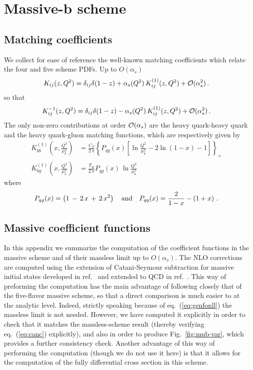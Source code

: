 \chapter{Massive-b scheme}

\section{Matching coefficients}
\label{sec:app-splitting}
We collect for ease of reference the well-known matching coefficients
which relate
the four and five scheme PDFs. Up to $O(\alpha_s)$
\begin{equation}
  K_{ij}(z,Q^2) = \delta_{ij}\delta(1-z) +
  \alpha_s(Q^2)\,K_{ij}^{(1)}(z,Q^2) +{\cal O}(\alpha_s^2)\,.
\end{equation}
so that
\begin{equation}
  K_{ij}^{-1}(z,Q^2) = \delta_{ij}\delta(1-z) -
  \alpha_s(Q^2)\,K_{ij}^{(1)}(z,Q^2) +{\cal O}(\alpha_s^2)\,.
\end{equation}
The only non-zero contributions at order ${\cal O}(\alpha_s)$
are the heavy quark-heavy quark and the heavy quark-gluon
matching functions, which are respectively given by
\begin{equation}
  \label{eq:ks}
  \begin{split}
    K_{bb}^{(1)}\left(x,\frac{Q^2}{\mu_b^2}\right) & = \frac{C_F}{2\,\pi}{\left\{P_{qq}(x)\left[
          \ln{\frac{Q^2}{\mu_b^2}} -2\ln(1-x)-1 \right] \right\}}_{+} \\
    K_{bg}^{(1)}\left(x,\frac{Q^2}{\mu_b^2}\right) & = \frac{T_R}{2\,\pi}
    P_{qg}(x)\,\ln{\frac{Q^2}{\mu_b^2}}
  \end{split}
\end{equation}
where 
\begin{equation}
  P_{qg}(x) = \left(1\,-\,2\,x\,+\,2\,x^2\right)\quad {\rm and }\quad
  P_{qq}(x) = \frac{2}{1-x} -\left( 1+x \right)\,.
\end{equation}

\section{Massive coefficient functions}
\label{sec:app-coeff}
In this appendix we summarize  the computation of the
coefficient functions in the massive scheme and of their massless
limit up to $O(\alpha_s)$. The NLO corrections are computed using
the extension of
Catani-Seymour subtraction for massive initial states developed
in ref.~\cite{Dittmaier:1999mb} and extended to QCD
in ref.~\cite{Krauss:2017wmx}. This way of preforming the computation 
has the main advantage of following closely that of the
five-flavor massive scheme, so that a direct comparison is much easier to
at the analytic level. Indeed, strictly speaking because of
eq.~(\ref{eq:genfonll}) the massless limit is not needed. However, we
have computed it explicitly in order to check that it matches the
massless-scheme result (thereby verifying eq.~(\ref{eq:canc})
explicitly), and also in order to produce Fig.~\ref{fig:mub-var},
which provides a further consistency check. Another advantage of this
way of performing the computation (though we do not use it here) is
that it allows for the computation of
the fully differential cross section in this scheme. 

